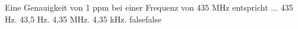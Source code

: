     {Eine Genauigkeit von 1 ppm bei einer Frequenz von 435 MHz entspricht ...}
    {435 Hz.}
    {43,5 Hz.}
    {4,35 MHz.}
    {4,35 kHz.}
    {false}{false}